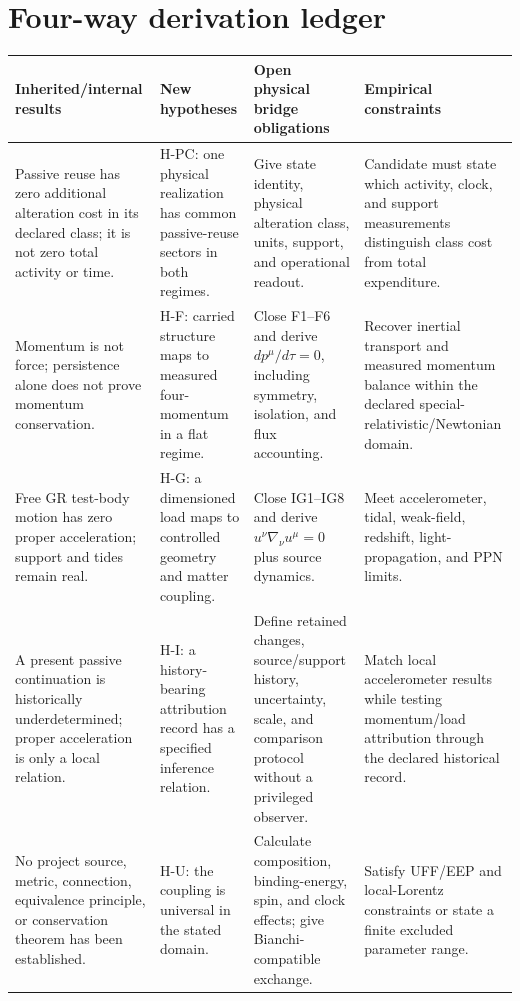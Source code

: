 \documentclass[11pt,a4paper]{article}
\theoremstyle{remark}
\begin{document}
\section{Four-way derivation ledger}\label{sec:ledger}
\small\setlength{\tabcolsep}{2pt}\sloppy
\begin{center}
\begin{tabular}{@{}>{\raggedright\arraybackslash}p{}>{\raggedright\arraybackslash}p{}>{\raggedright\arraybackslash}p{}>{\raggedright\arraybackslash}p{}@{}}
\toprule
\textbf{Inherited/internal results} & \textbf{New hypotheses} & \textbf{Open physical bridge obligations} & \textbf{Empirical constraints}\\
\midrule
Passive reuse has zero additional alteration cost in its declared class; it is not zero total activity or time. & H-PC: one physical realization has common passive-reuse sectors in both regimes. & Give state identity, physical alteration class, units, support, and operational readout. & Candidate must state which activity, clock, and support measurements distinguish class cost from total expenditure.\\
\addlinespace
Momentum is not force; persistence alone does not prove momentum conservation. & H-F: carried structure maps to measured four-momentum in a flat regime. & Close F1--F6 and derive $dp^\mu/d\tau=0$, including symmetry, isolation, and flux accounting. & Recover inertial transport and measured momentum balance within the declared special-relativistic/\allowbreak Newtonian domain.\\
\addlinespace
Free GR test-body motion has zero proper acceleration; support and tides remain real. & H-G: a dimensioned load maps to controlled geometry and matter coupling. & Close IG1--IG8 and derive $u^\nu\nabla_\nu u^\mu=0$ plus source dynamics. & Meet accelerometer, tidal, weak-field, redshift, light-propagation, and PPN limits.\\
\addlinespace
A present passive continuation is historically underdetermined; proper acceleration is only a local relation. & H-I: a history-bearing attribution record has a specified inference relation. & Define retained changes, source/support history, uncertainty, scale, and comparison protocol without a privileged observer. & Match local accelerometer results while testing momentum/load attribution through the declared historical record.\\
\addlinespace
No project source, metric, connection, equivalence principle, or conservation theorem has been established. & H-U: the coupling is universal in the stated domain. & Calculate composition, binding-energy, spin, and clock effects; give Bianchi-compatible exchange. & Satisfy UFF/EEP and local-Lorentz constraints or state a finite excluded parameter range.\\
\bottomrule
\end{tabular}
\end{center}
\fussy\normalsize\setlength{\tabcolsep}{6pt}
\end{document}
